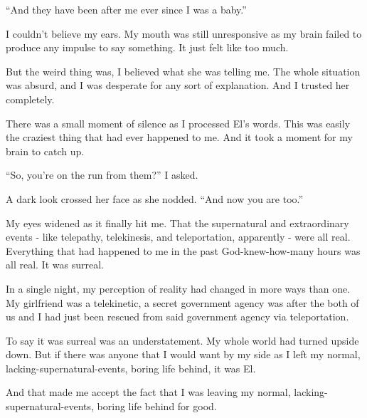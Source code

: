 “And they have been after me ever since I was a baby.”

I couldn’t believe my ears. My mouth was still unresponsive as my brain failed to produce any impulse to say something. It just felt like too much. 

But the weird thing was, I believed what she was telling me. The whole situation was absurd, and I was desperate for any sort of explanation. And I trusted her completely.

There was a small moment of silence as I processed El’s words. This was easily the craziest thing that had ever happened to me. And it took a moment for my brain to catch up.

“So, you’re on the run from them?” I asked.

A dark look crossed her face as she nodded. “And now you are too.”

My eyes widened as it finally hit me. That the supernatural and extraordinary events - like telepathy, telekinesis, and teleportation, apparently - were all real. Everything that had happened to me in the past God-knew-how-many hours was all real. It was surreal.

In a single night, my perception of reality had changed in more ways than one. My girlfriend was a telekinetic, a secret government agency was after the both of us and I had just been rescued from said government agency via teleportation. 

To say it was surreal was an understatement. My whole world had turned upside down. But if there was anyone that I would want by my side as I left my normal, lacking-supernatural-events, boring life behind, it was El. 

And that made me accept the fact that I was leaving my normal, lacking-supernatural-events, boring life behind for good.
